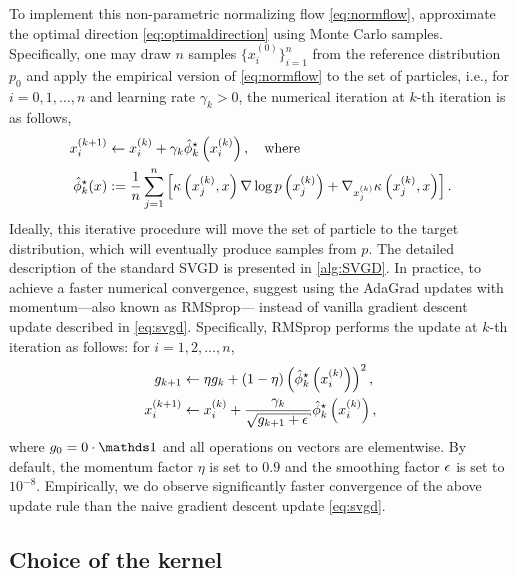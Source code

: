 To implement this non-parametric normalizing flow \cref{eq:normflow}, \citet{liu2016stein} approximate the optimal direction \cref{eq:optimaldirection} using Monte Carlo samples.
Specifically, one may draw $n$ samples $\{x_i^{(0)}  \}_{i = 1}^n$  from the reference distribution $p_0$ and apply the empirical version of \cref{eq:normflow} to the set of particles, i.e., for $i = 0, 1,\dots, n$ and learning rate $\gamma_k >0$,  the numerical iteration at $k$-th iteration is as follows,
\[
   \begin{aligned}
    x_{i}^{(k+1)} & \leftarrow x_{i}^{(k)}+ \gamma_k \hat{\phi}_k^{\star}\left(x_{i}^{(k)}\right),\quad \text {where } \\
    \hat{\phi}_k^{\star}(x) & := \frac{1}{n} \sum_{j=1}^{n}\left[\kappa\left(x_{j}^{(k)}, x\right) \nabla \log p\left(x_{j}^{(k)}\right)+\nabla_{x_{j}^{(k)}} \kappa\left(x_{j}^{(k)}, x\right)\right].
   \end{aligned}
   \label{eq:svgd}
\]
Ideally, this iterative procedure will move the set of particle to the target distribution, which will eventually produce samples from $p$.  The detailed description of the standard SVGD is presented in \cref{alg:SVGD}.
In practice, to achieve a faster numerical convergence, \citet{liu2016stein} suggest using the AdaGrad updates with momentum---also known as RMSprop--- instead of vanilla gradient descent update described in \cref{eq:svgd}.  
Specifically, RMSprop performs the update at $k$-th iteration as follows: for $i = 1, 2, \dots, n$,
\[\label{eq:rms}
    \begin{aligned}
        g_{k+1} &\gets \eta g_k + (1 - \eta) \left(\hat{\phi}_k^{\star}\left(x_{i}^{(k)}\right)\right)^2,\\
        x_{i}^{(k+1)} &\gets x_i^{(k)} + \frac{\gamma_k}{\sqrt{g_{k+1}+\eps} } \hat{\phi}_k^{\star}\left(x_{i}^{(k)}\right),  
    \end{aligned}  
\]
where $g_0 = 0\cdot\ind$ and all operations on vectors are elementwise. By default, the momentum factor $\eta$ is set to $0.9$ and the smoothing factor $\epsilon$ is set to $10^{-8}$. Empirically, we do observe significantly faster convergence of the above update rule than the naive gradient descent update \cref{eq:svgd}. 







\subsection{Choice of the kernel} \label{sec:kernelchoice}


